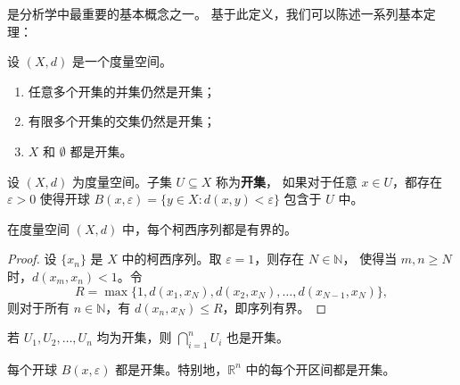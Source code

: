 
 是分析学中最重要的基本概念之一。
基于此定义，我们可以陈述一系列基本定理：

\begin{theorem}[开集的性质]
设 $(X, d)$ 是一个度量空间。
\begin{enumerate}[label=(\roman*)]
    \item 任意多个开集的并集仍然是开集；
    \item 有限多个开集的交集仍然是开集；
    \item $X$ 和 $\emptyset$ 都是开集。
\end{enumerate}
\end{theorem}


\begin{definition}[开集]
设 $(X, d)$ 为度量空间。子集 $U \subseteq X$ 称为\textbf{开集}，
如果对于任意 $x \in U$，都存在 $\varepsilon > 0$ 使得开球
$B(x, \varepsilon) = \{y \in X : d(x, y) < \varepsilon\}$ 包含于 $U$ 中。
\end{definition}

\begin{proposition}[柯西序列的有界性]
在度量空间 $(X, d)$ 中，每个柯西序列都是有界的。
\end{proposition}

\begin{proof}
设 $\{x_n\}$ 是 $X$ 中的柯西序列。取 $\varepsilon = 1$，则存在 $N \in \mathbb{N}$，
使得当 $m, n \ge N$ 时，$d(x_m, x_n) < 1$。令
\[
R = \max\{1, d(x_1, x_N), d(x_2, x_N), \ldots, d(x_{N-1}, x_N)\},
\]
则对于所有 $n \in \mathbb{N}$，有 $d(x_n, x_N) \le R$，即序列有界。
\end{proof}


\begin{lemma}
若 $U_1, U_2, \ldots, U_n$ 均为开集，则 $\bigcap_{i=1}^{n} U_i$ 也是开集。
\end{lemma}

\begin{corollary}
每个开球 $B(x, \varepsilon)$ 都是开集。特别地，$\mathbb{R}^{n}$ 中的每个开区间都是开集。
\end{corollary}

